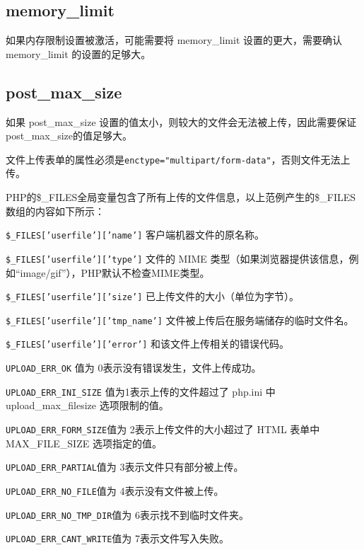 \subsection{memory\_limit}

如果内存限制设置被激活，可能需要将 memory\_limit 设置的更大，需要确认 memory\_limit 的设置的足够大。



\subsection{post\_max\_size}

如果 post\_max\_size 设置的值太小，则较大的文件会无法被上传，因此需要保证 post\_max\_size的值足够大。





文件上传表单的属性必须是\texttt{enctype="multipart/form-data"}，否则文件无法上传。

PHP的\$\_FILES全局变量包含了所有上传的文件信息，以上范例产生的\$\_FILES 数组的内容如下所示：

\begin{compactitem}
\item \texttt{\$\_FILES['userfile']['name']} 客户端机器文件的原名称。

\item \texttt{\$\_FILES['userfile']['type']} 文件的 MIME 类型（如果浏览器提供该信息，例如“image/gif”），PHP默认不检查MIME类型。

\item \texttt{\$\_FILES['userfile']['size']} 已上传文件的大小（单位为字节）。

\item \texttt{\$\_FILES['userfile']['tmp\_name']} 文件被上传后在服务端储存的临时文件名。

\item \texttt{\$\_FILES['userfile']['error']} 和该文件上传相关的错误代码。

\begin{compactenum}
\item \texttt{UPLOAD\_ERR\_OK} 值为 0表示没有错误发生，文件上传成功。
\item \texttt{UPLOAD\_ERR\_INI\_SIZE} 值为1表示上传的文件超过了 php.ini 中 upload\_max\_filesize 选项限制的值。
\item \texttt{UPLOAD\_ERR\_FORM\_SIZE}值为 2表示上传文件的大小超过了 HTML 表单中 MAX\_FILE\_SIZE 选项指定的值。
\item \texttt{UPLOAD\_ERR\_PARTIAL}值为 3表示文件只有部分被上传。
\item \texttt{UPLOAD\_ERR\_NO\_FILE}值为 4表示没有文件被上传。
\item \texttt{UPLOAD\_ERR\_NO\_TMP\_DIR}值为 6表示找不到临时文件夹。
\item \texttt{UPLOAD\_ERR\_CANT\_WRITE}值为 7表示文件写入失败。
\end{compactenum}

\end{compactitem}



